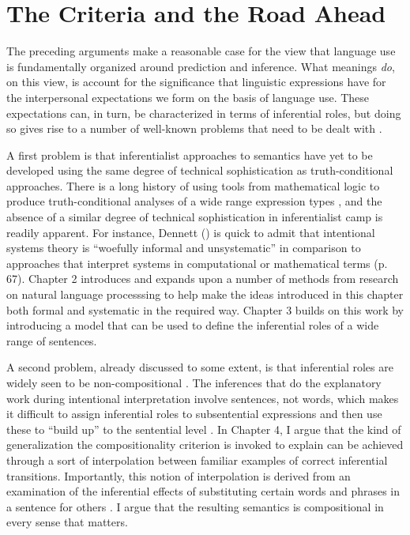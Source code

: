 \section{The Criteria and the Road Ahead}

The preceding arguments make a reasonable case for the view that language use is fundamentally organized around prediction and inference. What meanings \textit{do}, on this view, is account for the significance that linguistic expressions have for the interpersonal expectations we form on the basis of language use. These expectations can, in turn, be characterized in terms of inferential roles, but doing so gives rise to a number of well-known problems that need to be dealt with \citep{FodorLepore:1991,FodorLepore:2002}.

A first problem is that inferentialist approaches to semantics have yet to be developed using the same degree of technical sophistication as truth-conditional approaches. There is a long history of using tools from mathematical logic to produce truth-conditional analyses of a wide range expression types \citep[e.g.][]{Carpenter:1997}, and the absence of a similar degree of technical sophistication in inferentialist camp is readily apparent. For instance, Dennett (\citeyear{Dennett:1987}) is quick to admit that intentional systems theory is ``woefully informal and unsystematic'' in comparison to approaches that interpret systems in computational or mathematical terms (p. 67). Chapter 2 introduces and expands upon a number of methods from research on natural language processsing to help make the ideas introduced in this chapter both formal and systematic in the required way. Chapter 3 builds on this work by introducing a model that can be used to define the inferential roles of a wide range of sentences. 

A second problem, already discussed to some extent, is that inferential roles are widely seen to be non-compositional \citep{FodorLepore:2002,Fodor:1998,MargolisLaurence:1999}. The inferences that do the explanatory work during intentional interpretation involve sentences, not words, which makes it difficult to assign inferential roles to subsentential expressions and then use these to ``build up'' to the sentential level \citep{Brandom:1994}. In Chapter 4, I argue that the kind of generalization the compositionality criterion is invoked to explain can be achieved through a sort of interpolation between familiar examples of correct inferential transitions. Importantly, this notion of interpolation is derived from an examination of the inferential effects of substituting certain words and phrases in a sentence for others \citep{Brandom:1994}. I argue that the resulting semantics is compositional in every sense that matters.

